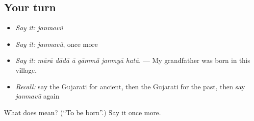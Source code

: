 \subsection*{Your turn}
\begin{itemize}
\raggedright
  \item \emph{Say it:} \emph{janmavũ}
  \item \emph{Say it:} \emph{janmavũ}, once more
  \item \emph{Say it:} \emph{mārā dādā ā gāmmā̃ janmyā hatā.} — My grandfather was born in this village.
  \item \emph{Recall:} say the Gujarati for ancient, then the Gujarati for the past, then say \emph{janmavũ} again
\end{itemize}

\begin{tcolorbox}[breakable,colback=teal!4,colframe=teal!35!black,title={Before you move on}]
What does  mean? (\textquotedblleft{}To be born\textquotedblright{}.) Say it once more.
\end{tcolorbox}

